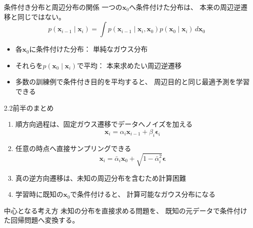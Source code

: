 \begin{frame}{条件付き分布と周辺分布の関係}
    一つの$\boldsymbol{x}_0$へ条件付けた分布は、
    本来の周辺逆遷移と同じではない。
    \[
        \boxed{
        p(\boldsymbol{x}_{i-1}\mid\boldsymbol{x}_i)
        =
        \int
        p(\boldsymbol{x}_{i-1}\mid
        \boldsymbol{x}_i,\boldsymbol{x}_0)
        p(\boldsymbol{x}_0\mid\boldsymbol{x}_i)
        \,d\boldsymbol{x}_0
        }
    \]
    \begin{itemize}
        \item 各$\boldsymbol{x}_0$に条件付けた分布：
        単純なガウス分布
        \item それらを$p(\boldsymbol{x}_0\mid\boldsymbol{x}_i)$で平均：
        本来求めたい周辺逆遷移
        \item 多数の訓練例で条件付き目的を平均すると、
        周辺目的と同じ最適予測を学習できる
    \end{itemize}
\end{frame}
\begin{frame}{2.2前半のまとめ}
    \begin{enumerate}
        \item 順方向過程は、固定ガウス遷移でデータへノイズを加える
        \[
            \boldsymbol{x}_i
            =\alpha_i\boldsymbol{x}_{i-1}
            +\beta_i\boldsymbol{\epsilon}_i
        \]
        \item 任意の時点へ直接サンプリングできる
        \[
            \boldsymbol{x}_i
            =\bar{\alpha}_i\boldsymbol{x}_0
            +\sqrt{1-\bar{\alpha}_i^2}\boldsymbol{\epsilon}
        \]
        \item 真の逆方向遷移は、未知の周辺分布を含むため計算困難
        \item 学習時に既知の$\boldsymbol{x}_0$で条件付けると、
        計算可能なガウス分布になる
    \end{enumerate}
    \begin{exampleblock}{中心となる考え方}
        未知の分布を直接求める問題を、
        既知の元データで条件付けた回帰問題へ変換する。
    \end{exampleblock}
\end{frame}
